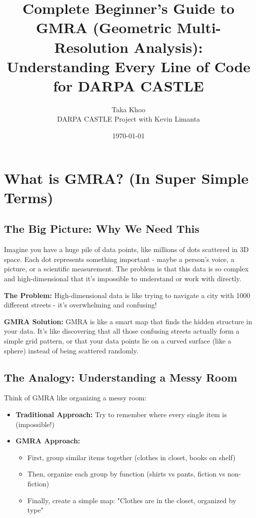 \documentclass[12pt]{article}
\title{\textbf{Complete Beginner's Guide to GMRA (Geometric Multi-Resolution Analysis): \\ Understanding Every Line of Code for DARPA CASTLE}}
\author{Taka Khoo \\ DARPA CASTLE Project with Kevin Limanta}
\date{\today}
\begin{document}
\maketitle

\tableofcontents
\newpage

\section{What is GMRA? (In Super Simple Terms)}

\subsection{The Big Picture: Why We Need This}

Imagine you have a huge pile of data points, like millions of dots scattered in 3D space. Each dot represents something important - maybe a person's voice, a picture, or a scientific measurement. The problem is that this data is so complex and high-dimensional that it's impossible to understand or work with directly.

\textbf{The Problem:} High-dimensional data is like trying to navigate a city with 1000 different streets - it's overwhelming and confusing!

\textbf{GMRA Solution:} GMRA is like a smart map that finds the hidden structure in your data. It's like discovering that all those confusing streets actually form a simple grid pattern, or that your data points lie on a curved surface (like a sphere) instead of being scattered randomly.

\subsection{The Analogy: Understanding a Messy Room}

Think of GMRA like organizing a messy room:
\begin{itemize}
    \item \textbf{Traditional Approach:} Try to remember where every single item is (impossible!)
    \item \textbf{GMRA Approach:} 
    \begin{itemize}
        \item First, group similar items together (clothes in closet, books on shelf)
        \item Then, organize each group by function (shirts vs pants, fiction vs non-fiction)
        \item Finally, create a simple map: "Clothes are in the closet, organized by type"
    \end{itemize}
\end{itemize}
\end{document}
